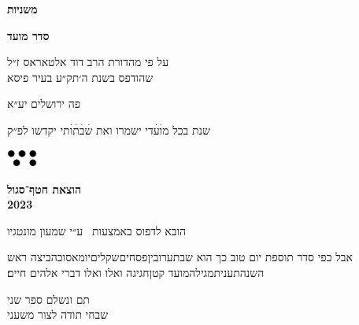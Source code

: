 \documentclass[14pt, a5paper, twoside, extrafontsizes]{memoir}
\begin{document}
\frontmatter
\pagestyle{myheadings}
\thispagestyle{mytitlepage}
\begin{hebrew}
{\Centering  

  {\huge\bfseries משניות}
  
  {\LARGE\bfseries סדר מועד}

  \vspace{1em}

  \vspace{0.5em}
  על פי מהדורת הרב דוד אלטאראס ז״ל\\שהודפס בשנת ה׳תק״ע בעיר פיסא

    \vspace{8em}
    פה {\LARGE ירושלים} יע״א

    {\small שנת}
    בכל מ{\Large וׄעׄ}די ישמרו ואת {\Large שׄבׄתׄוׄ}תי יקדשו
    {\small לפ״ק}
    
    \vspace{2em}
  \includegraphics[width=10mm]{hatafSegolLogoNoText.png}\\
  
    \vspace{.5em}
  {
    \bfseries הוצאת חטף־סגול\\2023
    
 {\footnotesize  הובא לדפוס באמצעות \XeLaTeX\ ע״י שמעון מונטגיו}

  }
    
}


\vspace{1em}
{
\parskip 2pt


\vspace{4pt}
{ \small
 {\larger  אבל} כפי סדר תוספת יום טוב כך הוא\hdot
 שבת\hdot ערובין\hdot פסחים\hdot שקלים\hdot יומא\hdot סוכה\hdot ביצה\hdot
 ראש השנה\hdot תענית\hdot מגילה\hdot מועד קטן\hdot חגיגה\hdot
 ואלו ואלו דברי אלהים חיים׃}
}
\mainmatter
\thispagestyle{empty}
















\def \sederCount{שני}


{\centering
  \LARGE תם ונשלם ספר שני\\שבחי תודה לצור משעני
}

\end{hebrew}
\end{document}
